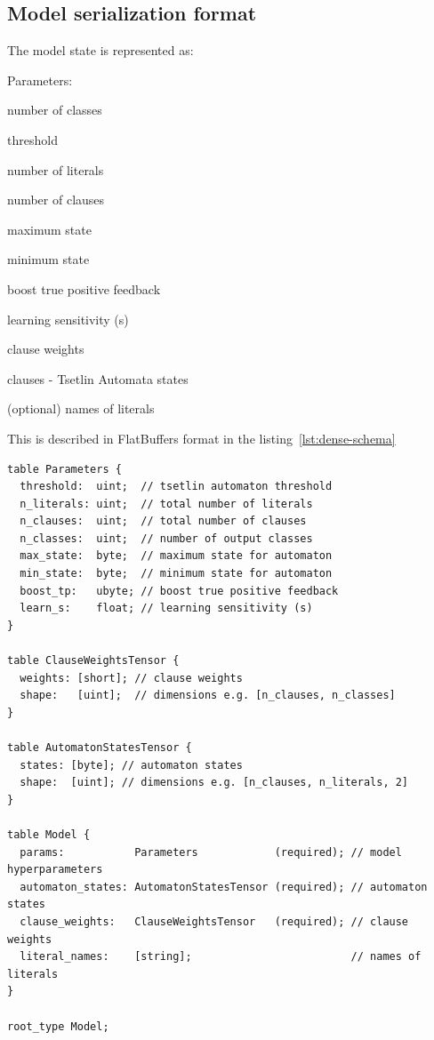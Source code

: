\documentclass[english]{aghengthesis} %
\begin{document}
\subsection{Model serialization format}

The model state is represented as:
\begin{compactitem}
    \item Parameters:
    \begin{compactitem}
        \item number of classes
        \item threshold
        \item number of literals
        \item number of clauses
        \item maximum state
        \item minimum state
        \item boost true positive feedback
        \item learning sensitivity (s)
    \end{compactitem}
    \item clause weights
    \item clauses - Tsetlin Automata states
    \item (optional) names of literals
\end{compactitem}
This is described in FlatBuffers format in the listing~\ref{lst:dense-schema}

\begin{lstlisting}[caption={[Coalesced TM FlatBuffers serialization format]Coalesced TM FlatBuffers serialization format},label=lst:dense-schema]
table Parameters {
  threshold:  uint;  // tsetlin automaton threshold
  n_literals: uint;  // total number of literals
  n_clauses:  uint;  // total number of clauses
  n_classes:  uint;  // number of output classes
  max_state:  byte;  // maximum state for automaton
  min_state:  byte;  // minimum state for automaton
  boost_tp:   ubyte; // boost true positive feedback
  learn_s:    float; // learning sensitivity (s)
}

table ClauseWeightsTensor {
  weights: [short]; // clause weights
  shape:   [uint];  // dimensions e.g. [n_clauses, n_classes]
}

table AutomatonStatesTensor {
  states: [byte]; // automaton states
  shape:  [uint]; // dimensions e.g. [n_clauses, n_literals, 2]
}

table Model {
  params:           Parameters            (required); // model hyperparameters
  automaton_states: AutomatonStatesTensor (required); // automaton states
  clause_weights:   ClauseWeightsTensor   (required); // clause weights
  literal_names:    [string];                         // names of literals
}

root_type Model;
\end{lstlisting}
\end{document}
